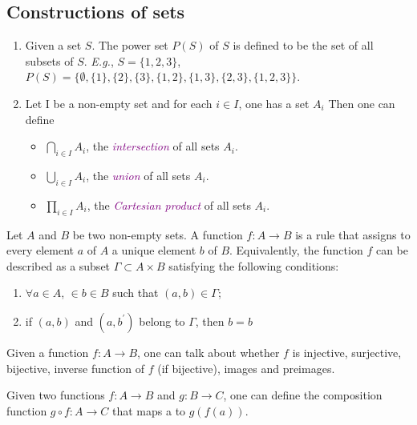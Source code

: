 

\subsection{Constructions of sets}

\begin{enumerate}
    \item Given a set $S$. The power set $P(S)$ of $S$ is defined to be the set of all subsets of $S$. \textit{E.g.},
    $S = \{1, 2, 3\}$, $P(S) = \{\emptyset, \{1\}, \{2\}, \{3\}, \{1, 2\}, \{1, 3\}, \{2, 3\}, \{1, 2, 3\}\}$.
    \item  Let I be a non-empty set and for each $i \in I$, one has a set $A_i$ Then one can define
    \begin{itemize}
        \item $\bigcap_{i \in I} A_{i}$, the \textcolor{purple}{\textit{intersection}} of all sets $A_{i}$.
        \item $\bigcup_{i \in I} A_{i}$, the \textcolor{purple}{\textit{union}} of all sets $A_{i}$.
        \item $\prod_{i \in I} A_{i}$, the \textcolor{purple}{\textit{Cartesian product}} of all sets $A_{i}$.
    \end{itemize}
\end{enumerate}

\begin{definition}
    Let $A$ and $B$ be two non-empty sets. A function $f : A \rightarrow B$ is a rule that assigns to every
    element $a$ of $A$ a unique element $b$ of $B$. Equivalently, the function $f$ can be described
    as a subset $\Gamma \subset A \times B$ satisfying the following conditions:
    \begin{enumerate}
        \item $\forall a \in A$, $\in b \in B$ such that $(a, b) \in \Gamma$;
        \item if $(a, b)$ and $(a, b^{\prime})$ belong to $\Gamma$, then $b = b$
    \end{enumerate}
\end{definition}


Given a function $f : A \rightarrow B$, one can talk about whether $f$ is injective, surjective,
bijective, inverse function of $f$ (if bijective), images and preimages.

Given two functions $f : A \rightarrow B$ and $g : B \rightarrow C$, one can define the composition function
$g \circ f : A \rightarrow C$ that maps a to $g(f(a))$.

